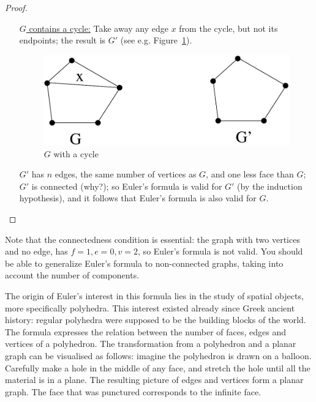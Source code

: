 \begin{proof}
\begin{itemize}
\begin{itemize}
\item[\underline{$G$ contains a cycle:}]
Take away any edge $x$ from
the cycle, but not its endpoints; the result is $G'$ (see
e.g. Figure~\ref{euler3}).
\begin{figure}[ht]
\begin{center}
\includegraphics[width=0.4\linewidth,keepaspectratio]{euler3}
\end{center}
\caption{$G$ with a cycle \label{euler3}}
\end{figure}
$G'$ has $n$ edges, the same number of vertices as $G$, and one less
face than $G$; $G'$ is connected (why?); so Euler's formula is valid
for $G'$ (by the induction hypothesis), and it follows that Euler's
formula is also valid for $G$.
\end{itemize}
\end{itemize}
\end{proof}

Note that the connectedness condition is essential: the graph with two
vertices and no edge, has $f = 1, e = 0, v = 2$, so Euler's formula is
not valid. You should be able to generalize Euler's formula to
non-connected graphs, taking into account the number of components.

The origin of Euler's interest in this formula lies in the study of
spatial objects, more specifically polyhedra. This interest
existed already since Greek ancient history: regular polyhedra were
supposed to be the building blocks of the world. The formula expresses
the relation between the number of faces, edges and vertices of a
polyhedron. The transformation from a polyhedron and a planar graph
can be visualised as follows: imagine the polyhedron is drawn on a
balloon. Carefully make a hole in the middle of any face, and stretch
the hole until all the material is in a plane. The resulting picture
of edges and vertices form a planar graph. The face that was punctured
corresponds to the infinite face.

